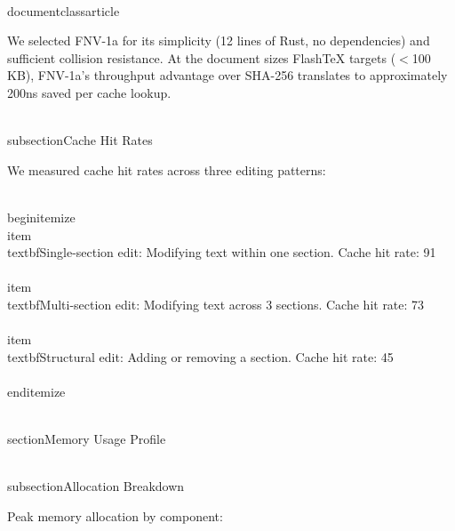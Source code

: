 \\documentclass{article}
\begin{document}
We selected FNV-1a for its simplicity (12 lines of Rust, no dependencies)
and sufficient collision resistance. At the document sizes FlashTeX
targets ($<$100 KB), FNV-1a's throughput advantage over SHA-256 translates
to approximately 200ns saved per cache lookup.

\\subsection{Cache Hit Rates}

We measured cache hit rates across three editing patterns:

\\begin{itemize}
  \\item \\textbf{Single-section edit}: Modifying text within one section.
    Cache hit rate: 91\\%
  \\item \\textbf{Multi-section edit}: Modifying text across 3 sections.
    Cache hit rate: 73\\%
  \\item \\textbf{Structural edit}: Adding or removing a section. Cache
    hit rate: 45\\%
\\end{itemize}

\\section{Memory Usage Profile}

\\subsection{Allocation Breakdown}

Peak memory allocation by component:
\end{document}
